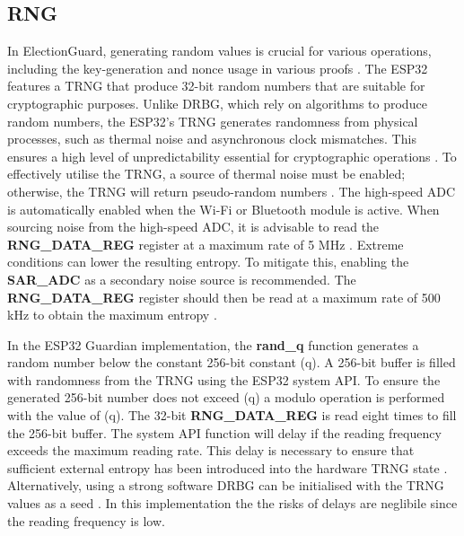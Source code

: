 \subsection{\ac{RNG}}
In ElectionGuard, generating random values is crucial for various operations, including the key-generation and nonce usage in various proofs \cite[9, 13]{eg-spec}. The ESP32 features a \ac{TRNG} that produce 32-bit random numbers that are suitable for cryptographic purposes. Unlike \ac{DRBG}, which rely on algorithms to produce random numbers, the ESP32's \ac{TRNG} generates randomness from physical processes, such as thermal noise and asynchronous clock mismatches. This ensures a high level of unpredictability essential for cryptographic operations \cite[604]{esp32-ref}. To effectively utilise the \ac{TRNG}, a source of thermal noise must be enabled; otherwise, the \ac{TRNG} will return pseudo-random numbers \cite[609]{esp32-ref}. The high-speed \ac{ADC} is automatically enabled when the Wi-Fi or Bluetooth module is active. When sourcing noise from the high-speed \ac{ADC}, it is advisable to read the \textbf{RNG\_DATA\_REG} register at a maximum rate of 5 MHz \cite[609]{esp32-ref}. Extreme conditions can lower the resulting entropy. To mitigate this, enabling the \textbf{SAR\_ADC} as a secondary noise source is recommended. The \textbf{RNG\_DATA\_REG} register should then be read at a maximum rate of 500 kHz to obtain the maximum entropy \cite[609]{esp32-ref}.

In the ESP32 Guardian implementation, the \textbf{rand\_q} function generates a random number below the constant 256-bit constant (q). A 256-bit buffer is filled with randomness from the \ac{TRNG} using the ESP32 system API. To ensure the generated 256-bit number does not exceed (q) a modulo operation is performed with the value of (q). The 32-bit \textbf{RNG\_DATA\_REG} is read eight times to fill the 256-bit buffer. The system API function will delay if the reading frequency exceeds the maximum reading rate. This delay is necessary to ensure that sufficient external entropy has been introduced into the hardware \ac{TRNG} state \cite{esp32-ref}. Alternatively, using a strong software \ac{DRBG} can be initialised with the \ac{TRNG} values as a seed \cite{esp32-ref} \cite[588]{wolfSSL-manual}. In this implementation the the risks of delays are neglibile since the reading frequency is low.

